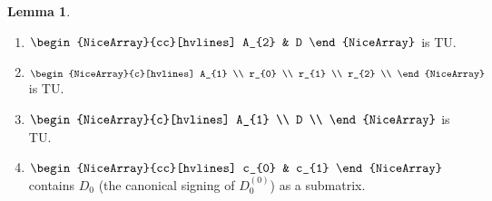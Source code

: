 \documentclass{article}
\theoremstyle{definition}
\newtheorem{lemma}[theorem]{Lemma}
\begin{document}
\begin{lemma}
\begin{enumerate}
        \item\label{item:three_sum_canonical_signing_TU_A_2_D} $\begin{NiceArray}{cc}[hvlines] A_{2} & D \end{NiceArray}$ is TU.
        \item\label{item:three_sum_canonical_signing_TU_A_1_rs} $\begin{NiceArray}{c}[hvlines] A_{1} \\ r_{0} \\ r_{1} \\ r_{2} \\ \end{NiceArray}$ is TU.
        \item\label{item:three_sum_canonical_signing_TU_A_1_D} $\begin{NiceArray}{c}[hvlines] A_{1} \\ D \\ \end{NiceArray}$ is TU.
        \item $\begin{NiceArray}{cc}[hvlines] c_{0} & c_{1} \end{NiceArray}$ contains $D_{0}$ (the canonical signing of $D_{0}^{(0)}$) as a submatrix.
    \end{enumerate}
\end{lemma}
\end{document}
